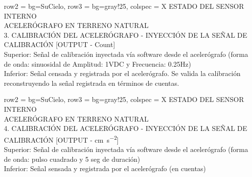 \begin{table}[H]
    \begin{tblr}{
        row{2} = {bg=SuCielo},
        row{3} = {bg=gray!25},
        colspec = {X}
    }
        ESTADO DEL SENSOR INTERNO \\
        ACELERÓGRAFO EN TERRENO NATURAL \\
        3. CALIBRACIÓN DEL ACELERÓGRAFO - INYECCIÓN DE LA SEÑAL DE CALIBRACIÓN [OUTPUT - Count] \\
        {Superior: Señal de calibración inyectada vía software desde el acelerógrafo (forma de onda: sinuosidal de Amplitud: 1VDC y Frecuencia: 0.25Hz) \\ Inferior: Señal censada y registrada por el acelerógrafo. Se valida la calibración reconstruyendo la señal registrada en términos de cuentas.}
    \end{tblr}
\end{table}
\begin{table}[H]
    \begin{tblr}{
        row{2} = {bg=SuCielo},
        row{3} = {bg=gray!25},
        colspec = {X}
    }
        ESTADO DEL SENSOR INTERNO \\
        ACELERÓGRAFO EN TERRENO NATURAL \\
        4. CALIBRACIÓN DEL ACELERÓGRAFO - INYECCIÓN DE LA SEÑAL DE CALIBRACIÓN [OUTPUT - \unit{\centi\metre\per\second\squared}] \\
         {Superior: Señal de calibración inyectada vía software desde el acelerógrafo (forma de onda: pulso cuadrado y 5 seg de duración)\\Inferior: Señal sensada y registrada por el acelerógrafo (en cuentas)}\\
    \end{tblr}
\end{table}
